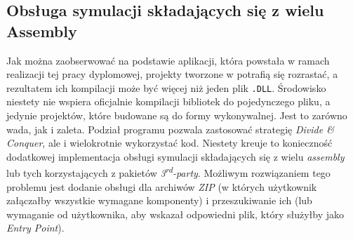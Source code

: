 \subsection{Obsługa symulacji składających się z wielu Assembly}
\label{subsec:obslugaSymulacjiSkladajacychSieZWieluAssembly}

\par Jak można zaobserwować na podstawie aplikacji, która powstała w ramach realizacji tej pracy dyplomowej, projekty tworzone w \emph{\dotnet{}} potrafią się rozrastać, a rezultatem ich kompilacji może być więcej niż jeden plik \texttt{.DLL}. Środowisko \emph{\dotnet{}} niestety nie wspiera oficjalnie kompilacji bibliotek do pojedynczego pliku, a jedynie projektów, które budowane są do formy wykonywalnej. Jest to zarówno wada, jak i zaleta. Podział programu pozwala zastosować strategię \emph{Divide \& Conquer}, ale i wielokrotnie wykorzystać kod. Niestety kreuje to konieczność dodatkowej implementacja obsługi symulacji składających się z wielu \emph{assembly} lub tych korzystających z pakietów \emph{3\textsuperscript{rd}-party}. Możliwym rozwiązaniem tego problemu jest dodanie obsługi dla archiwów \emph{ZIP} (w których użytkownik załączałby wszystkie wymagane komponenty) i przeszukiwanie ich (lub wymaganie od użytkownika, aby wskazał odpowiedni plik, który służyłby jako \emph{Entry Point}).